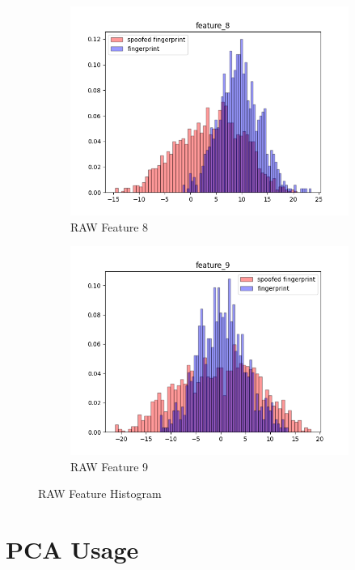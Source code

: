 \documentclass[english]{report}
\begin{document}
\begin{figure}[h!]
\begin{subfigure}{0.3\textwidth}
        \includegraphics[scale=0.3]{../../images/feature_plot/hist_feature_8}
        \caption{RAW Feature 8}
    \end{subfigure}
    \begin{subfigure}{0.3\textwidth}
        \includegraphics[scale=0.3]{../../images/feature_plot/hist_feature_9}
        \caption{RAW Feature 9}
    \end{subfigure}
    \centering
    \caption{RAW Feature Histogram}
\end{figure}



\section{PCA Usage}
\end{document}
